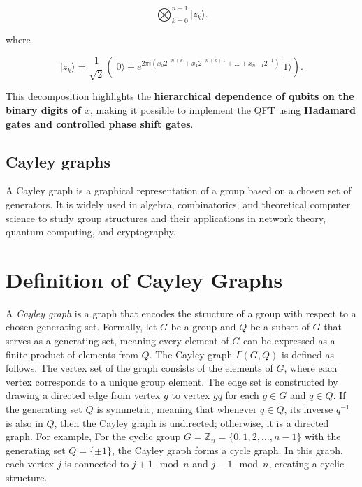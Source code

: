 \documentclass[11pt]{article}
\theoremstyle{definition}
\begin{document}
\[
\bigotimes_{k=0}^{n-1} | z_k \rangle.
\]

where

\[
| z_k \rangle = \frac{1}{\sqrt{2}} ( | 0 \rangle + e^{2\pi i ( x_0 2^{-n+k} + x_1 2^{-n+k+1} + \dots + x_{n-1} 2^{-1} )} | 1 \rangle ).
\]

This decomposition highlights the \textbf{hierarchical dependence of qubits on the binary digits of \( x \)}, making it possible to implement the QFT using \textbf{Hadamard gates and controlled phase shift gates}.

\subsection*{Cayley graphs}

A Cayley graph is a graphical representation of a group based on a chosen set of generators. It is widely used in algebra, combinatorics, and theoretical computer science to study group structures and their applications in network theory, quantum computing, and cryptography.

\section*{Definition of Cayley Graphs}

A \textit{Cayley graph} is a graph that encodes the structure of a group with respect to a chosen generating set. Formally, let \( G \) be a group and \( Q \) be a subset of \( G \) that serves as a generating set, meaning every element of \( G \) can be expressed as a finite product of elements from \( Q \). The Cayley graph \( \Gamma(G, Q) \) is defined as follows. The vertex set of the graph consists of the elements of \( G \), where each vertex corresponds to a unique group element. The edge set is constructed by drawing a directed edge from vertex \( g \) to vertex \( gq \) for each \( g \in G \) and \( q \in Q \). If the generating set \( Q \) is symmetric, meaning that whenever \( q \in Q \), its inverse \( q^{-1} \) is also in \( Q \), then the Cayley graph is undirected; otherwise, it is a directed graph.
For example, For the cyclic group \( G = \mathbb{Z}_n = \{0,1,2,\dots, n-1\} \) with the generating set \( Q = \{\pm 1\} \), the Cayley graph forms a cycle graph. In this graph, each vertex \( j \) is connected to \( j+1 \mod n \) and \( j-1 \mod n \), creating a cyclic structure.\\
\end{document}
